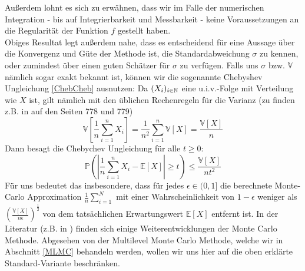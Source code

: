  	Außerdem lohnt es sich zu erwähnen, dass wir im Falle der numerischen Integration - bis auf Integrierbarkeit und Messbarkeit - keine Voraussetzungen an die Regularität der Funktion $ f $ gestellt haben.\\
 	Obiges Resultat legt außerdem nahe, dass es entscheidend für eine Aussage über die Konvergenz und Güte der Methode ist, die Standardabweichung $ \sigma $ zu kennen, oder zumindest über einen guten Schätzer für $ \sigma $ zu verfügen.
 	Falls uns $ \sigma $ bzw. $ \mathbb{V} $ nämlich sogar exakt bekannt ist, können wir die sogenannte Chebyshev Ungleichung \eqref{ChebCheb} ausnutzen:
 	Da $ (X_i)_{i \in \mathbb{N}} $ eine u.i.v.-Folge mit Verteilung wie $ X $ ist, gilt nämlich mit den üblichen Rechenregeln für die Varianz (zu finden z.B. in \cite{brokate2016grundwissen} auf den Seiten 778 und 779)
 	\[
 		\mathbb{V}[\frac{1}{n}\sum_{i=1}^{n}X_i] =  \frac{1}{n^2} \sum_{i=1}^{n} \mathbb{V}[X] = \frac{\mathbb{V}[X]}{n}
 	\]
 	Dann besagt die Chebychev Ungleichung für alle $ t \geq 0 $:
 	\[
 		\mathbb{P}\left(\left| \frac{1}{n}\sum_{i=1}^{n}X_i-\mathbb{E}[X] \right| \geq t \right) \leq \frac{\mathbb{V}[X]}{nt^2}
 	\]
 	Für uns bedeutet das insbesondere, dass für jedes $ \epsilon \in (0,1] $  die berechnete Monte-Carlo Approximation $ \frac{1}{n}\sum_{i=1}^{N} $ mit einer Wahrscheinlichkeit von $ 1-\epsilon $ weniger als $ \left( \frac{\mathbb{V}[X]}{n\epsilon}\right)^{\frac{1}{2}} $ von dem tatsächlichen Erwartungswert $ \mathbb{E}[X] $ entfernt ist.
 	In der Literatur (z.B. in \cite{sullivan2015introduction}) finden sich einige Weiterentwicklungen der Monte Carlo Methode. Abgesehen von der Multilevel Monte Carlo Methode, welche wir in Abschnitt \ref{MLMC} behandeln werden, wollen wir uns hier auf die oben erklärte Standard-Variante beschränken.
 	
 
 	
	
	
	


